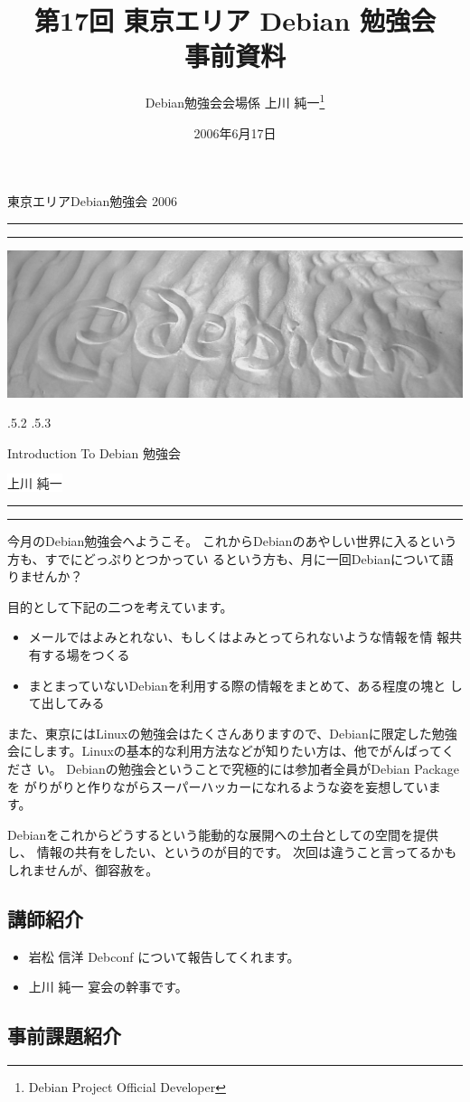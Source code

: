 \documentclass[mingoth,a4paper]{jsarticle}
\makeatletter
\renewcommand{\section}{\@startsection{section}{1}{\z@}%
    {\Cvs \@plus.5\Cdp \@minus.2\Cdp}%
    {.5\Cvs \@plus.3\Cdp}%
    {\normalfont\Huge\headfont\raggedright\centering}} %
\newcommand{\dancersection}[2]{%
\newpage
東京エリアDebian勉強会 2006
\hrule
\vspace{0.5mm}
\hrule
\hfill{}\includegraphics[width=16cm]{image2006-natsu/guruguru-sand-light.png}\\
\vspace{-5cm}
\begin{center}
\section{#1}
\end{center}
\hfill{}\colorbox{white}{#2}\hspace{3cm}\space\\
\vspace{1cm}
\hrule
\vspace{0.5mm}
\hrule
\vspace{1cm}
}
\makeatother
\begin{document}
\begin{titlepage}

\title{
 第17回 東京エリア Debian 勉強会\\事前資料}
\date{2006年6月17日}
\author{Debian勉強会会場係 上川 純一\thanks{Debian Project Official Developer}} 
\maketitle
\thispagestyle{empty}
\end{titlepage}

\newpage
\tableofcontents

\dancersection{Introduction To Debian 勉強会}{上川 純一}

今月のDebian勉強会へようこそ。
これからDebianのあやしい世界に入るという方も、すでにどっぷりとつかってい
るという方も、月に一回Debianについて語りませんか？

目的として下記の二つを考えています。

\begin{itemize}
 \item メールではよみとれない、もしくはよみとってられないような情報を情
       報共有する場をつくる
 \item まとまっていないDebianを利用する際の情報をまとめて、ある程度の塊と
       して出してみる
\end{itemize}

また、東京にはLinuxの勉強会はたくさんありますので、Debianに限定した勉強
会にします。Linuxの基本的な利用方法などが知りたい方は、他でがんばってくださ
い。
Debianの勉強会ということで究極的には参加者全員がDebian Packageを
がりがりと作りながらスーパーハッカーになれるような姿を妄想しています。

Debianをこれからどうするという能動的な展開への土台としての空間を提供し、
情報の共有をしたい、というのが目的です。
次回は違うこと言ってるかもしれませんが、御容赦を。

\subsection{講師紹介}

\begin{itemize}
 \item{岩松 信洋} Debconf について報告してくれます。
 \item{上川 純一} 宴会の幹事です。
\end{itemize}

\subsection{事前課題紹介}
\end{document}
